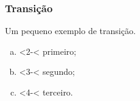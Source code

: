 \begin{frame}\frametitle{Transi\c c\~ao}
	Um pequeno exemplo de transi\c c\~ao.
	
	\pause
	
	\begin{enumerate}[a)]
		\item<2-< primeiro;
		\item<3-< segundo;
		\item<4-< terceiro.
	\end{enumerate}
\end{frame}